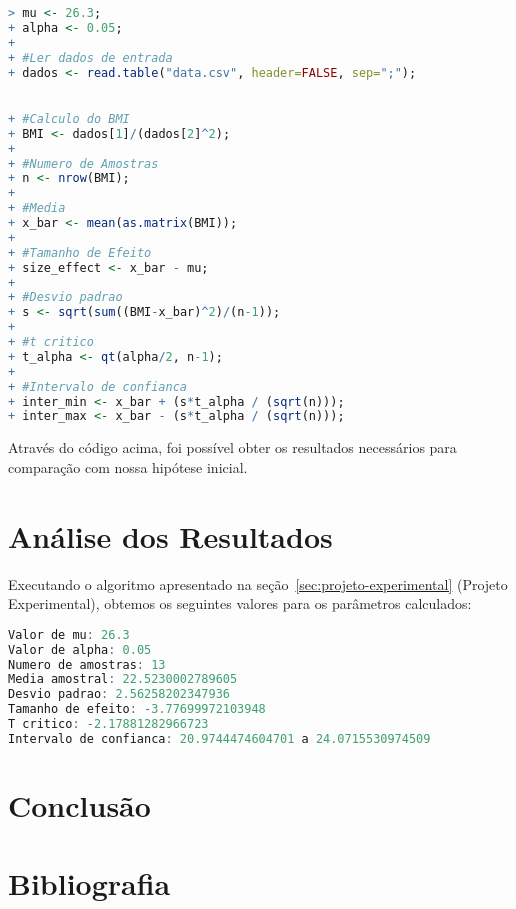 \documentclass[12pt, a4paper]{article}
\begin{document}
\begin{lstlisting}[language=R]
> mu <- 26.3;
+ alpha <- 0.05;
+	
+ #Ler dados de entrada
+ dados <- read.table("data.csv", header=FALSE, sep=";");
	

+ #Calculo do BMI
+ BMI <- dados[1]/(dados[2]^2);
+	
+ #Numero de Amostras
+ n <- nrow(BMI);
+	
+ #Media
+ x_bar <- mean(as.matrix(BMI));
+	
+ #Tamanho de Efeito
+ size_effect <- x_bar - mu;
+	
+ #Desvio padrao
+ s <- sqrt(sum((BMI-x_bar)^2)/(n-1));
+	
+ #t critico
+ t_alpha <- qt(alpha/2, n-1);
+	
+ #Intervalo de confianca
+ inter_min <- x_bar + (s*t_alpha / (sqrt(n)));
+ inter_max <- x_bar - (s*t_alpha / (sqrt(n)));	
\end{lstlisting}
\par Através do código acima, foi possível obter os resultados necessários para comparação com nossa hipótese inicial.

\section{Análise dos Resultados}
Executando o algoritmo apresentado na seção~\ref{sec:projeto-experimental} (Projeto Experimental), obtemos os seguintes valores para os parâmetros calculados:

\begin{lstlisting}[language=R]
Valor de mu: 26.3
Valor de alpha: 0.05
Numero de amostras: 13
Media amostral: 22.5230002789605
Desvio padrao: 2.56258202347936
Tamanho de efeito: -3.77699972103948
T critico: -2.17881282966723
Intervalo de confianca: 20.9744474604701 a 24.0715530974509
\end{lstlisting}


\section{Conclusão}

\section{Bibliografia}
		
\end{document}
